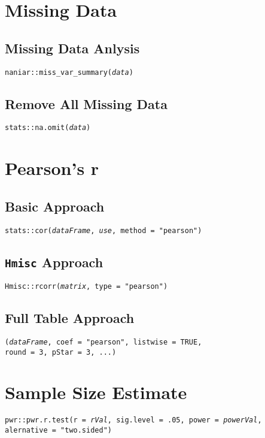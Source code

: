 \documentclass{tufte-handout}
\newenvironment{subs}
  {\adjustwidth{3em}{0pt}}
  {\endadjustwidth}
\begin{document}
\vspace{5mm}
\section{Missing Data}
\begin{subs}
\subsection{Missing Data Anlysis}
\noindent \texttt{naniar::}{\color{red}\texttt{miss\_var\_summary}}\texttt{(\textit{data})}

\vspace{3mm}
\subsection{Remove All Missing Data}
\noindent \texttt{stats::}{\color{red}\texttt{na.omit}}\texttt{(\textit{data})}
\end{subs}

\vspace{5mm}
\section{Pearson's r}
\begin{subs}
\subsection{Basic Approach}
\noindent \texttt{stats::}{\color{red}\texttt{cor}}\texttt{(\textit{dataFrame}, \textit{use}, method = "pearson")}

\vspace{3mm}
\subsection{\texttt{Hmisc} Approach}
\noindent \texttt{Hmisc::}{\color{red}\texttt{rcorr}}\texttt{(\textit{matrix}, type = "pearson")}

\vspace{3mm}
\subsection{Full Table Approach}
\texttt{(\textit{dataFrame}, coef = "pearson", listwise = TRUE, \\ round = 3, pStar = 3, ...)}
\end{subs}

\vspace{5mm}
\section{Sample Size Estimate}
\noindent \texttt{pwr::}{\color{red}\texttt{pwr.r.test}}\texttt{(r = \textit{rVal}, sig.level = .05, power = \textit{powerVal}, \\ alernative = "two.sided")}

\end{document}
